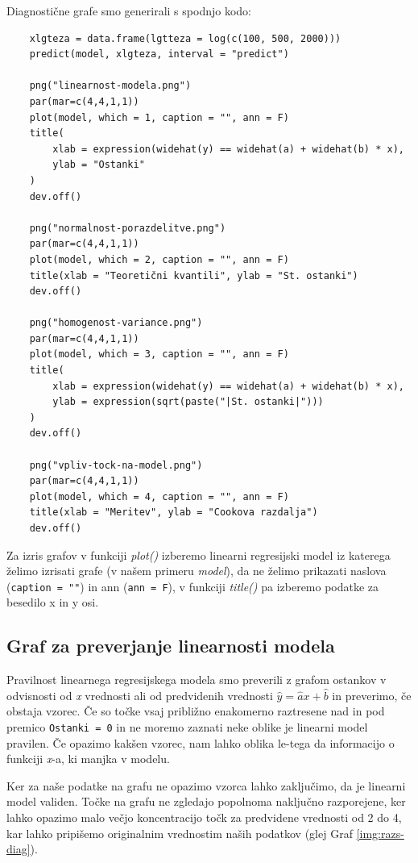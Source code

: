 \newpage

\noindent
Diagnostične grafe smo generirali s spodnjo kodo:

\begin{verbatim}
    xlgteza = data.frame(lgtteza = log(c(100, 500, 2000)))
    predict(model, xlgteza, interval = "predict")
    
    png("linearnost-modela.png")
    par(mar=c(4,4,1,1))
    plot(model, which = 1, caption = "", ann = F)
    title(
        xlab = expression(widehat(y) == widehat(a) + widehat(b) * x),
        ylab = "Ostanki"
    )
    dev.off()
    
    png("normalnost-porazdelitve.png")
    par(mar=c(4,4,1,1))
    plot(model, which = 2, caption = "", ann = F)
    title(xlab = "Teoretični kvantili", ylab = "St. ostanki")
    dev.off()
    
    png("homogenost-variance.png")
    par(mar=c(4,4,1,1))
    plot(model, which = 3, caption = "", ann = F)
    title(
        xlab = expression(widehat(y) == widehat(a) + widehat(b) * x),
        ylab = expression(sqrt(paste("|St. ostanki|")))
    )
    dev.off()
    
    png("vpliv-tock-na-model.png")
    par(mar=c(4,4,1,1))
    plot(model, which = 4, caption = "", ann = F)
    title(xlab = "Meritev", ylab = "Cookova razdalja")
    dev.off()
\end{verbatim}

\noindent
Za izris grafov v funkciji \emph{plot()} izberemo linearni regresijski model iz katerega želimo izrisati grafe
(v našem primeru \emph{model}), da ne želimo prikazati naslova (\verb|caption = ""|) in ann (\verb|ann = F|),
v funkciji \emph{title()} pa izberemo podatke za besedilo x in y osi.

\subsection{Graf za preverjanje linearnosti modela}

Pravilnost linearnega regresijskega modela smo preverili z grafom ostankov v odvisnosti od \emph{x} vrednosti ali od
predvidenih vrednosti $\widehat{y} = \widehat{a}x + \widehat{b}$ in preverimo, če obstaja vzorec.
Če so točke vsaj približno enakomerno raztresene nad in pod premico \verb|Ostanki = 0| in ne moremo zaznati neke oblike
je linearni model pravilen.
Če opazimo kakšen vzorec, nam lahko oblika le-tega da informacijo o funkciji \emph{x}-a, ki manjka v modelu.

Ker za naše podatke na grafu ne opazimo vzorca lahko zaključimo, da je linearni model validen.
Točke na grafu ne zgledajo popolnoma naključno razporejene, ker lahko opazimo malo večjo koncentracijo točk za
predvidene vrednosti od 2 do 4, kar lahko pripišemo originalnim vrednostim naših podatkov
(glej Graf \ref{img:razs-diag}).

